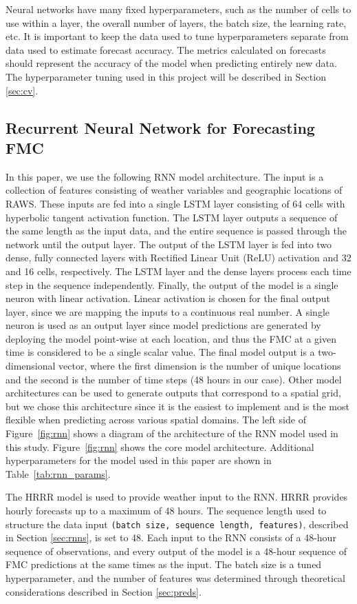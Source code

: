 \documentclass[fire,article,submit,pdftex,moreauthors]{Definitions/mdpi}
\begin{document}
Neural networks have many fixed hyperparameters, such as the number of cells to use within a layer, the overall number of layers, the batch size, the learning rate, etc. It is important to keep the data used to tune hyperparameters separate from data used to estimate forecast accuracy. The metrics calculated on forecasts should represent the accuracy of the model when predicting entirely new data. The hyperparameter tuning used in this project will be described in Section \ref{sec:cv}.

\subsection{Recurrent Neural Network for Forecasting FMC}
\label{sec:model}
In this paper, we use the following RNN model architecture. The input is a collection of features consisting of weather variables and geographic locations of RAWS. These inputs are fed into a single LSTM layer consisting of 64 cells with hyperbolic tangent activation function. The LSTM layer outputs a sequence of the same length as the input data, and the entire sequence is passed through the network until the output layer. The output of the LSTM layer is fed into two dense, fully connected layers with Rectified Linear Unit (ReLU) activation and 32 and 16 cells, respectively. The LSTM layer and the dense layers process each time step in the sequence independently. Finally, the output of the model is a single neuron with linear activation. Linear activation is chosen for the final output layer, since we are mapping the inputs to a continuous real number. A single neuron is used as an output layer since model predictions are generated by deploying the model point-wise at each location, and thus the FMC at a given time is considered to be a single scalar value. The final model output is a two-dimensional vector, where the first dimension is the number of unique locations and the second is the number of time steps (48 hours in our case). Other model architectures can be used to generate outputs that correspond to a spatial grid, but we chose this architecture since it is the easiest to implement and is the most flexible when predicting across various spatial domains. The left side of Figure~\ref{fig:rnn} shows a diagram of the architecture of the RNN model used in this study. Figure~\ref{fig:rnn} shows the core model architecture. Additional hyperparameters for the model used in this paper are shown in Table~\ref{tab:rnn_params}.

The HRRR model is used to provide weather input to the RNN. HRRR provides hourly forecasts up to a maximum of 48 hours. The sequence length used to structure the data input \texttt{(batch size, sequence length, features)}, described in Section \ref{sec:rnns}, is set to 48. Each input to the RNN consists of a 48-hour sequence of observations, and every output of the model is a 48-hour sequence of FMC predictions at the same times as the input. The batch size is a tuned hyperparameter, and the number of features was determined through theoretical considerations described in Section \ref{sec:preds}. 
\end{document}
